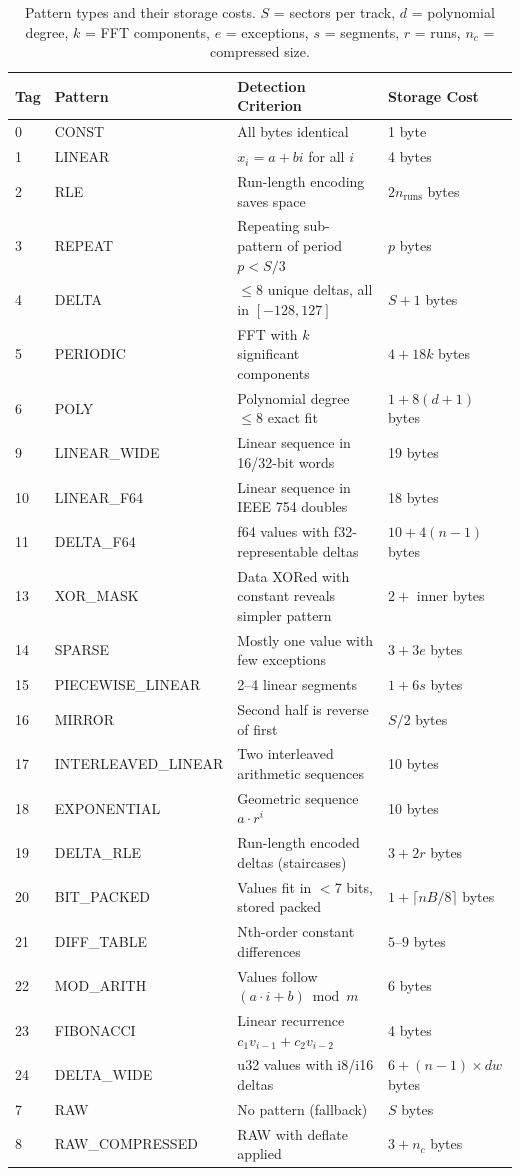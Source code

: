 \documentclass[11pt,a4paper]{article}
\begin{document}
\begin{table}[H]
\centering
\small
\begin{tabular}{@{}llll@{}}
\toprule
\textbf{Tag} & \textbf{Pattern} & \textbf{Detection Criterion} & \textbf{Storage Cost} \\
\midrule
0 & CONST & All bytes identical & 1 byte \\
1 & LINEAR & $x_i = a + bi$ for all $i$ & 4 bytes \\
2 & RLE & Run-length encoding saves space & $2n_{\text{runs}}$ bytes \\
3 & REPEAT & Repeating sub-pattern of period $p < S/3$ & $p$ bytes \\
4 & DELTA & $\leq 8$ unique deltas, all in $[-128, 127]$ & $S+1$ bytes \\
5 & PERIODIC & FFT with $k$ significant components & $4 + 18k$ bytes \\
6 & POLY & Polynomial degree $\leq 8$ exact fit & $1 + 8(d+1)$ bytes \\
9 & LINEAR\_WIDE & Linear sequence in 16/32-bit words & 19 bytes \\
10 & LINEAR\_F64 & Linear sequence in IEEE 754 doubles & 18 bytes \\
11 & DELTA\_F64 & f64 values with f32-representable deltas & $10 + 4(n-1)$ bytes \\
13 & XOR\_MASK & Data XORed with constant reveals simpler pattern & $2 +$ inner bytes \\
14 & SPARSE & Mostly one value with few exceptions & $3 + 3e$ bytes \\
15 & PIECEWISE\_LINEAR & 2--4 linear segments & $1 + 6s$ bytes \\
16 & MIRROR & Second half is reverse of first & $S/2$ bytes \\
17 & INTERLEAVED\_LINEAR & Two interleaved arithmetic sequences & 10 bytes \\
18 & EXPONENTIAL & Geometric sequence $a \cdot r^i$ & 10 bytes \\
19 & DELTA\_RLE & Run-length encoded deltas (staircases) & $3 + 2r$ bytes \\
20 & BIT\_PACKED & Values fit in $<$7 bits, stored packed & $1 + \lceil nB/8 \rceil$ bytes \\
21 & DIFF\_TABLE & Nth-order constant differences & $5$--$9$ bytes \\
22 & MOD\_ARITH & Values follow $(a \cdot i + b) \bmod m$ & 6 bytes \\
23 & FIBONACCI & Linear recurrence $c_1 v_{i-1} + c_2 v_{i-2}$ & 4 bytes \\
24 & DELTA\_WIDE & u32 values with i8/i16 deltas & $6 + (n-1) \times dw$ bytes \\
7 & RAW & No pattern (fallback) & $S$ bytes \\
8 & RAW\_COMPRESSED & RAW with deflate applied & $3 + n_c$ bytes \\
\bottomrule
\end{tabular}
\caption{Pattern types and their storage costs. $S$ = sectors per track, $d$ = polynomial degree, $k$ = FFT components, $e$ = exceptions, $s$ = segments, $r$ = runs, $n_c$ = compressed size.}
\end{table}
\end{document}
